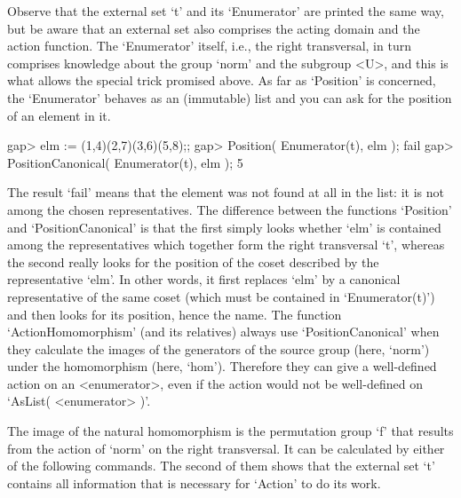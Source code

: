 Observe  that the external set `t'  and  its `Enumerator' are printed the
same way, but  be aware that an   external set also comprises  the acting
domain  and the action function.  The  `Enumerator' itself, i.e.,  the
right transversal, in turn comprises knowledge about the group `norm' and
the  subgroup <U>,  and  this is what  allows  the special trick promised
above. As far as `Position' is  concerned, the `Enumerator' behaves as an
(immutable) list and you can ask for the position of an element in it.

\beginexample
gap> elm := (1,4)(2,7)(3,6)(5,8);;
gap> Position( Enumerator(t), elm );
fail
gap> PositionCanonical( Enumerator(t), elm );
5
\endexample

The result `fail'   means that the element was   not found at  all in the
list: it is not among the chosen  representatives. The difference between
the functions `Position' and `PositionCanonical' is that the first simply
looks whether `elm' is contained among the representatives which together
form the  right transversal `t', whereas  the second really looks for the
position of the  coset described by  the  representative `elm'. In  other
words, it first replaces `elm' by a  canonical representative of the same
coset (which must be contained in `Enumerator(t)') and then looks for its
position, hence the name. The  function `ActionHomomorphism' (and  its
relatives) always use  `PositionCanonical' when they calculate the images
of   the  generators of  the    source  group (here,  `norm')   under the
homomorphism  (here, `hom').  Therefore  they  can  give a   well-defined
action on an   <enumerator>, even   if the   action  would not   be
well-defined on `AsList( <enumerator> )'.

%

The image of  the natural homomorphism  is the permutation group `f' that
results from the action of `norm' on the right  transversal. It can be
calculated by either of the following commands. The second of them shows
that the external set `t' contains all information  that is necessary for
`Action' to do its work.


